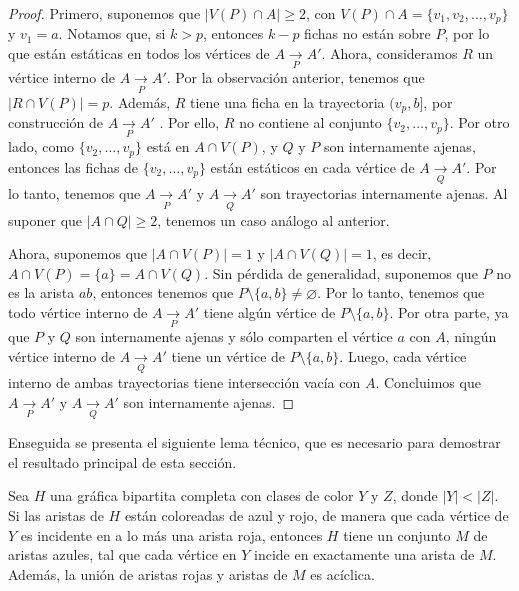 \begin{proof}
    Primero, suponemos que $|V(P) \cap A| \geq 2$, con $V(P) \cap A = \{v_{1},
    v_{2}, \dots, v_{p}\}$ y $v_{1} = a$. Notamos que, si $k > p$, entonces
    $k-p$ fichas no est\'an sobre $P$, por lo que est\'an est\'aticas en todos
    los v\'ertices de $A \xrightarrow[P]{} A'$. Ahora, consideramos $R$ un
    v\'ertice interno de $A \xrightarrow[P]{} A'$. Por la observaci\'on
    anterior, tenemos que  $|R \cap V(P)| = p$. Adem\'as, $R$ tiene una ficha en
    la trayectoria $(v_{p},b ]$, por construcci\'on de $A \xrightarrow[P]{} A'$
    . Por ello, $R$ no contiene al conjunto $\{v_{2}, \dots, v_{p}\}$. Por otro
    lado, como $\{v_{2}, \dots, v_{p}\}$ est\'a en $A \cap V(P)$, y $Q$ y $P$
    son internamente ajenas, entonces las fichas de $\{v_{2}, \dots, v_{p}\}$
    est\'an est\'aticos en cada v\'ertice de $A \xrightarrow[Q]{} A'$. Por lo
    tanto, tenemos que $A \xrightarrow[P]{} A'$ y $A \xrightarrow[Q]{}A'$ son
    trayectorias internamente ajenas. Al suponer que $|A \cap Q| \geq 2$,
    tenemos un caso an\'alogo al anterior.

    Ahora, suponemos que $|A \cap V(P)| = 1$ y $|A \cap V(Q)| = 1$, es decir, $A
    \cap V(P) = \{a\} = A \cap V(Q)$. Sin p\'erdida de generalidad, suponemos
    que $P$ no es la arista $ab$, entonces tenemos que $P \setminus \{a,b\} \neq
    \varnothing$. Por lo tanto, tenemos que todo v\'ertice interno de $A
    \xrightarrow[P]{} A'$ tiene alg\'un v\'ertice de $P \setminus \{a, b\}$. Por
    otra parte, ya que $P$ y $Q$ son internamente ajenas y s\'olo comparten el
    v\'ertice $a$ con $A$, ning\'un v\'ertice interno de $A \xrightarrow[Q]{}
    A'$ tiene un v\'ertice de $P \setminus \{a, b\}$. Luego, cada v\'ertice
    interno de ambas trayectorias tiene intersecci\'on vac\'ia con $A$.
    Concluimos que $A \xrightarrow[P]{} A'$ y $A \xrightarrow[Q]{} A'$ son
    internamente ajenas.
\end{proof}

Enseguida se presenta el siguiente lema t\'ecnico, que es necesario para
demostrar el resultado principal de esta secci\'on. 

\begin{lema}%
\label{lem:rb-bipGraph}
    Sea $H$ una gr\'afica bipartita completa con clases de color $Y$ y $Z$,
    donde $|Y|<|Z|$. Si las aristas de $H$ est\'an coloreadas de azul y rojo, de
    manera que cada v\'ertice de $Y$ es incidente en a lo m\'as una arista roja,
    entonces $H$ tiene un conjunto $M$ de aristas azules, tal que cada v\'ertice
    en $Y$ incide en exactamente una arista de $M$. Adem\'as, la uni\'on de
    aristas rojas y aristas de $M$ es ac\'iclica.
\end{lema}

